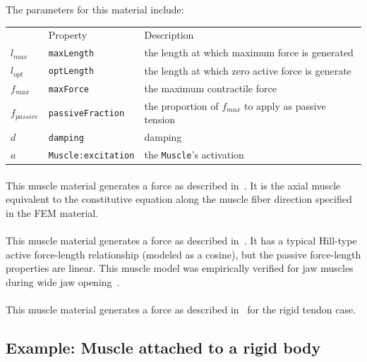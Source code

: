 The parameters for this material include:\\
\begin{tabular}{|l|l|l|} \hline
 & Property & Description \\
$l_{max}$ & {\tt maxLength} & the length at which maximum force is generated \\
$l_{opt}$ & {\tt optLength} & the length at which zero active force is generate \\
$f_{max}$ & {\tt maxForce} & the maximum contractile force \\
$f_{passive}$ & {\tt passiveFraction} & the proportion of $f_{max}$ to apply as passive tension \\
$d$ & {\tt damping} & damping \\ 
$a$ & {\tt Muscle:excitation} & the {\tt Muscle}'s activation \\ \hline
\end{tabular}


\paragraph{}
This muscle material generates a force as described in~\cite{blemker:2005:muscle}. It is the axial muscle
equivalent to the constitutive equation along the muscle fiber direction specified in the 
 FEM material.

\paragraph{}
This muscle material generates a force as described in~\cite{peck2000dynamic}. 
It has a typical Hill-type active force-length relationship (modeled as a cosine), but 
the passive force-length properties are linear. This muscle model was empirically
verified for jaw muscles during wide jaw opening~\cite{peck2000dynamic}.

\paragraph{}
This muscle material generates a force as described in~\cite{millard2013flexing} for 
the rigid tendon case. 


\subsection{Example: Muscle attached to a rigid body}
\label{SimpleMuscleExample:sec}

